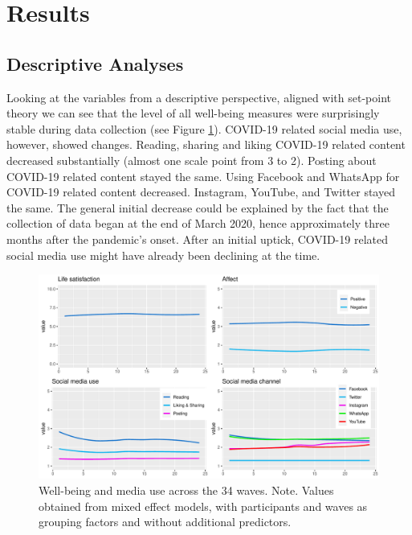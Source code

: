 \documentclass[
  man,mask,floatsintext]{apa7}
\begin{document}
\hypertarget{results}{%
\section{Results}\label{results}}

\hypertarget{descriptive-analyses}{%
\subsection{Descriptive Analyses}\label{descriptive-analyses}}

Looking at the variables from a descriptive perspective, aligned with set-point theory we can see that the level of all well-being measures were surprisingly stable during data collection (see Figure \ref{fig:fig-descriptives}).
COVID-19 related social media use, however, showed changes.
Reading, sharing and liking COVID-19 related content decreased substantially (almost one scale point from 3 to 2).
Posting about COVID-19 related content stayed the same.
Using Facebook and WhatsApp for COVID-19 related content decreased.
Instagram, YouTube, and Twitter stayed the same.
The general initial decrease could be explained by the fact that the collection of data began at the end of March 2020, hence approximately three months after the pandemic's onset.
After an initial uptick, COVID-19 related social media use might have already been declining at the time.

\begin{figure}
\includegraphics[width=\textwidth]{figures/fig_descriptives} \caption{Well-being and media use across the 34 waves. Note. Values obtained from mixed effect models, with participants and waves as grouping factors and without additional predictors.}\label{fig:fig-descriptives}
\end{figure}
\end{document}
